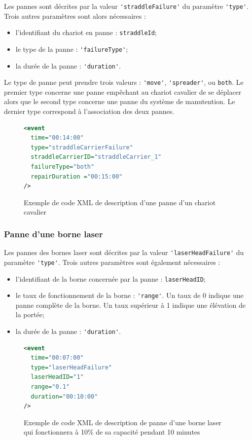 Les pannes sont décrites par la valeur \verb!'straddleFailure'! du paramètre \verb!'type'!. Trois autres paramètres sont alors nécessaires : 
\begin{itemize}
 \item l'identifiant du chariot en panne : \verb!straddleId!;
 \item le type de la panne : \verb!'failureType'!;
 \item la durée de la panne : \verb!'duration'!.
\end{itemize}

Le type de panne peut prendre trois valeurs : \verb!'move'!, \verb!'spreader'!, ou \verb!both!. Le premier type concerne une panne empêchant au chariot cavalier de se déplacer alors que le second type concerne une panne du système de manutention. Le dernier type correspond à l'association des deux pannes.

\begin{figure}[ht]
\centering
 \begin{lstlisting}[language=XML]
<event
  time="00:14:00"
  type="straddleCarrierFailure"
  straddleCarrierID="straddleCarrier_1"
  failureType="both"
  repairDuration ="00:15:00"
/>
\end{lstlisting}
\caption{Exemple de code XML de description d'une panne d'un chariot cavalier}
\label{fig:simulation:evt:failure}
\end{figure}

\subsubsection{Panne d'une borne laser}


Les pannes des bornes laser sont décrites par la valeur \verb!'laserHeadFailure'! du paramètre \verb!'type'!. Trois autres paramètres sont également nécessaires : 
\begin{itemize}
 \item l'identifiant de la borne concernée par la panne : \verb!laserHeadID!;
 \item le taux de fonctionnement de la borne : \verb!'range'!. Un taux de 0 indique une panne complète de la borne. Un taux supérieur à 1 indique une élévation de la portée;
 \item la durée de la panne : \verb!'duration'!.
\end{itemize}

\begin{figure}[ht]
\centering
 \begin{lstlisting}[language=XML]
<event 
  time="00:07:00" 
  type="laserHeadFailure" 
  laserHeadID="1" 
  range="0.1" 
  duration="00:10:00"
/>
\end{lstlisting}
\caption{Exemple de code XML de description de panne d'une borne laser qui fonctionnera à 10\% de sa capacité pendant 10 minutes}
\label{fig:simulation:evt:LHfailure}
\end{figure}

